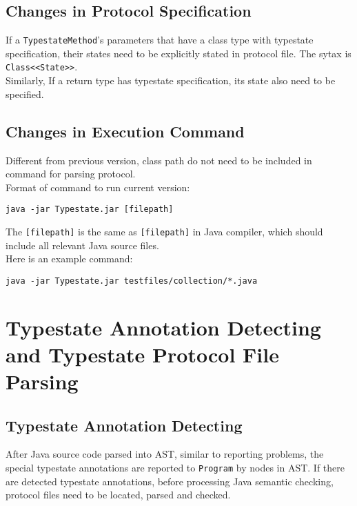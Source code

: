 \documentclass[]{article}
\begin{document}
\subsection{Changes in Protocol Specification}
If a \texttt{TypestateMethod}'s parameters that have a class type with typestate specification, their states need to be explicitly stated in protocol file. The sytax is \texttt{Class<<State>>}. \\[0.2cm]
Similarly, If a return type has typestate specification, its state also need to be specified.

\subsection{Changes in Execution Command}
Different from previous version, class path do not need to be included in command for parsing protocol. \\[0.2cm]
Format of command to run current version:
\begin{verbatim}
java -jar Typestate.jar [filepath]
\end{verbatim}
The \texttt{[filepath]} is the same as \texttt{[filepath]} in Java compiler, which should include all relevant Java source files.\\[0.2cm]
Here is an example command:
\begin{verbatim}
java -jar Typestate.jar testfiles/collection/*.java
\end{verbatim}

\section{Typestate Annotation Detecting and Typestate Protocol File Parsing}
\subsection{Typestate Annotation Detecting}
After Java source code parsed into AST, similar to reporting problems, the special typestate annotations are reported to \texttt{Program} by nodes in AST. If there are detected typestate annotations, before processing Java semantic checking, protocol files need to be located, parsed and checked.
\end{document}
